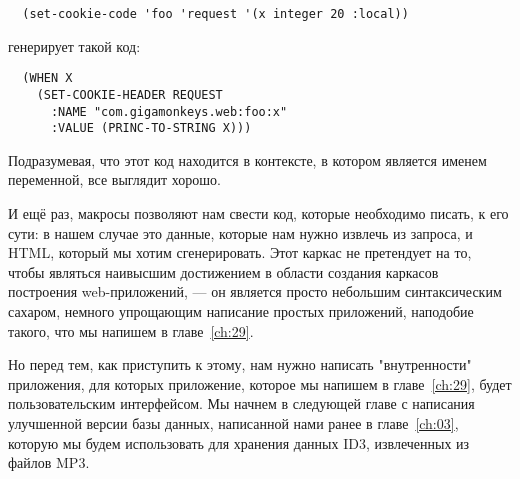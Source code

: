 \begin{lstlisting}
  (set-cookie-code 'foo 'request '(x integer 20 :local))
\end{lstlisting}

генерирует такой код:

\begin{lstlisting}
  (WHEN X
    (SET-COOKIE-HEADER REQUEST
      :NAME "com.gigamonkeys.web:foo:x"
      :VALUE (PRINC-TO-STRING X)))
\end{lstlisting}

Подразумевая, что этот код находится в контексте, в котором  является именем
переменной, все выглядит хорошо.

И ещё раз, макросы позволяют нам свести код, которые необходимо писать, к его сути: в
нашем случае это данные, которые нам нужно извлечь из запроса, и HTML, который мы хотим
сгенерировать. Этот каркас не претендует на то, чтобы являться наивысшим достижением в
области создания каркасов построения web-приложений, --- он является просто небольшим
синтаксическим сахаром, немного упрощающим написание простых приложений, наподобие такого,
что мы напишем в главе~\ref{ch:29}.

Но перед тем, как приступить к этому, нам нужно написать "внутренности" приложения, для
которых приложение, которое мы напишем в главе~\ref{ch:29}, будет пользовательским
интерфейсом. Мы начнем в следующей главе с написания улучшенной версии базы данных,
написанной нами ранее в главе~\ref{ch:03}, которую мы будем использовать для хранения
данных ID3, извлеченных из файлов MP3.

